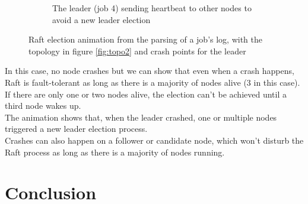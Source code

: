 \documentclass{eplmastersthesis}
\begin{document}
\begin{figure}[H]
\begin{subfigure}{.45\textwidth}
            \caption{The leader (job 4) sending heartbeat to other nodes to avoid a new leader election}
            \label{fig:ele4}
          \end{subfigure}

          \caption{Raft election animation from the parsing of a job's log, with the topology in figure \ref{fig:topo2}
          and crash points for the leader}
          \label{fig:election}
        \end{figure}

        In this case, no node crashes but we can show that even when a crash
        happens, Raft is fault-tolerant as long as there is a majority of
        nodes alive (3 in this case). If there are only one or two nodes alive,
        the election can't be achieved until a third node wakes up.\\
        The animation shows that, when the leader crashed, one or multiple
        nodes triggered a new leader election process.\\
        Crashes can also happen on a follower or candidate node, which won't
        disturb the Raft process as long as there is a majority of nodes
        running.





  \chapter{Conclusion}
\end{document}
